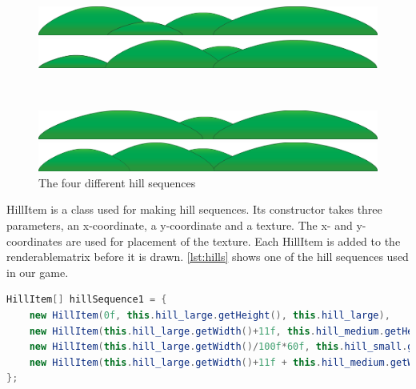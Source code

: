 \begin{figure}[h]
\begin{minipage}[h]{0.3\textwidth}
\includegraphics[scale=0.08]{img/hills1.pdf}
\end{minipage} \hspace{0.2\textwidth}
\begin{minipage}[h]{0.3\textwidth}
\includegraphics[scale=0.08]{img/hills2.pdf}
\end{minipage}\hspace{0.2\textwidth}\\[0.5cm]
\begin{minipage}[h]{0.3\textwidth}
\includegraphics[scale=0.08]{img/hills3.pdf}
\end{minipage}\hspace{0.21\textwidth}
\begin{minipage}[h]{0.3\textwidth}
\includegraphics[scale=0.08]{img/hills4.pdf}
\end{minipage}
\caption{The four different hill sequences}
\label{fig:hills}
\end{figure}



HillItem is a class used for making hill sequences. Its constructor takes three parameters, an x-coordinate, a y-coordinate and a texture. The x- and y-coordinates are used for placement of the texture. Each HillItem is added to the renderablematrix before it is drawn. \autoref{lst:hills} shows one of the hill sequences used in our game.

\begin{lstlisting}[language=java,firstnumber=1,caption={Hill sequence.},label=lst:hills]
HillItem[] hillSequence1 = {
    new HillItem(0f, this.hill_large.getHeight(), this.hill_large),
    new HillItem(this.hill_large.getWidth()+11f, this.hill_medium.getHeight(), this.hill_medium),
    new HillItem(this.hill_large.getWidth()/100f*60f, this.hill_small.getHeight(), this.hill_small),
    new HillItem(this.hill_large.getWidth()+11f + this.hill_medium.getWidth()/100f*65f, this.hill_larger.getHeight(), this.hill_larger)
};
\end{lstlisting}

